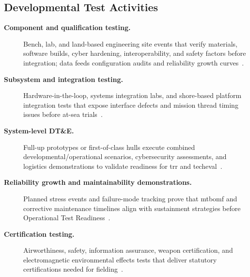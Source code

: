 \documentclass[../main.tex]{subfiles}
\begin{document}
\subsection{Developmental Test Activities}
\begin{description}
  \item[\textbf{Component and qualification testing.}] Bench, lab, and land-based engineering site events that verify materials, software builds, cyber hardening, interoperability, and safety factors before integration; data feeds configuration audits and reliability growth curves~\autocite{edo-3-5-5-test-eval-part-i-2025}.
  \item[\textbf{Subsystem and integration testing.}] Hardware-in-the-loop, systems integration labs, and shore-based platform integration tests that expose interface defects and mission thread timing issues before at-sea trials~\autocite{edo-3-5-5-test-eval-part-i-2025}.
  \item[\textbf{System-level DT\&E.}] Full-up prototypes or first-of-class hulls execute combined developmental/operational scenarios, cybersecurity assessments, and logistics demonstrations to validate readiness for \ac{trr} and \ac{techeval}~\autocite{DoDI5000-85}.
  \item[\textbf{Reliability growth and maintainability demonstrations.}] Planned stress events and failure-mode tracking prove that \ac{mtbomf} and corrective maintenance timelines align with sustainment strategies before Operational Test Readiness~\autocite{DoDI5000-89}.
  \item[\textbf{Certification testing.}] Airworthiness, safety, information assurance, weapon certification, and electromagnetic environmental effects tests that deliver statutory certifications needed for fielding~\autocite{edo-3-5-5-test-eval-part-i-2025}.
\end{description}
\end{document}
